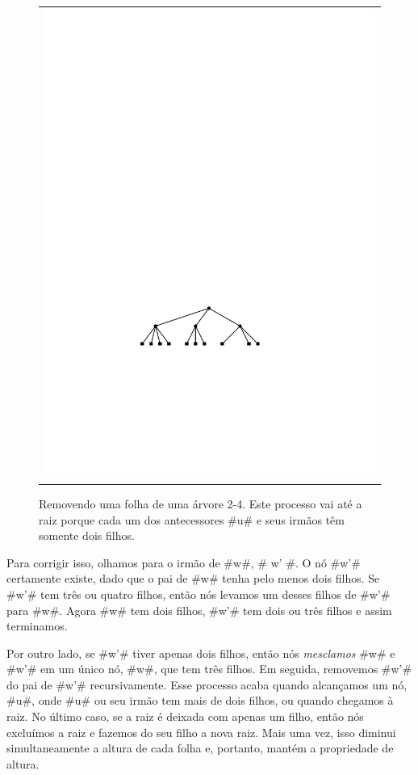 \begin{figure}
\begin{center}
\begin{tabular}{c}
			\includegraphics[height=\FifthHeightScaleIfNeeded]{figs/24tree-remove-5} \\
		\end{tabular}
	\end{center}
	\caption[Removing a leaf from a 2-4 Tree]{Removendo uma folha de uma árvore
		2-4.  Este processo vai até a raiz porque cada um dos
		antecessores #u#  e seus irmãos têm somente dois filhos.}
\end{figure}

Para corrigir isso, olhamos para o irmão de #w#, # w' #. O nó #w'# certamente
existe, dado que o pai de #w# tenha pelo menos dois filhos. Se #w'#
tem três ou quatro filhos, então nós levamos um desses filhos de #w'#
para #w#. Agora #w# tem dois filhos, #w'# tem dois ou três
filhos e assim terminamos.

Por outro lado, se #w'# tiver apenas dois filhos, então nós \emph{mesclamos}
%
#w# e #w'# em um único nó, #w#, que tem três filhos. Em seguida,
removemos #w'# do pai de #w'# recursivamente. Esse processo acaba
quando alcançamos um nó, #u#, onde #u# ou seu irmão tem mais de dois
filhos, ou quando chegamos à raiz. No último caso, se a raiz
é deixada com apenas um filho, então nós excluímos a raiz e fazemos do seu filho
a nova raiz. Mais uma vez, isso diminui simultaneamente a altura de cada
folha e, portanto, mantém a propriedade de altura.


